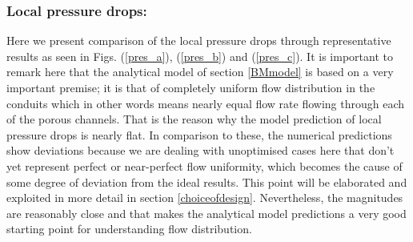 \documentclass[twocolumn,10pt,cleanfoot]{ihmtc}
\begin{document}
\subsubsection*{Local pressure drops:} Here we present comparison of the local pressure drops through representative results as seen in Figs. (\ref{pres_a}), (\ref{pres_b}) and (\ref{pres_c}). It is important to remark here that the analytical model of section \ref{BMmodel} is based on a very important premise; it is that of completely uniform flow distribution in the conduits which in other words means nearly equal flow rate flowing through each of the porous channels. That is the reason why the model prediction of local pressure drops is nearly flat. In comparison to these, the numerical predictions show deviations because we are dealing with unoptimised cases here that don't yet represent perfect or near-perfect flow uniformity, which becomes the cause of some degree of deviation from the ideal results. This point will be elaborated and exploited in more detail in section \ref{choiceofdesign}. Nevertheless, the magnitudes are reasonably close and that makes the analytical model predictions a very good starting point for understanding flow distribution. 
%
\end{document}
